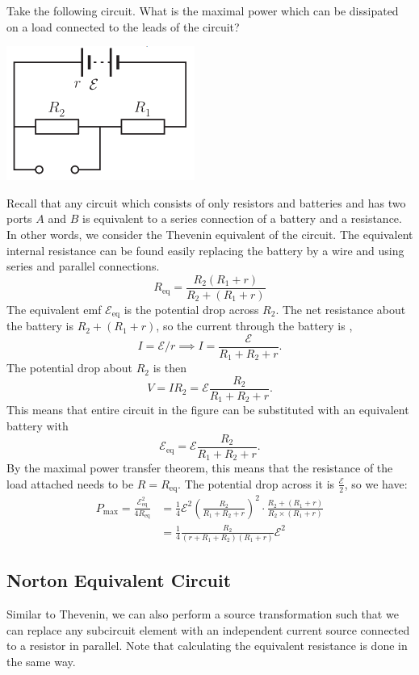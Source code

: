 \documentclass{article}
\begin{document}
\begin{example}
    Take the following circuit. What is the maximal power which can be dissipated on a load connected to the leads of the circuit?
    \begin{center}
        \includegraphics[width=0.3\linewidth]{pr10.png}
    \end{center}
    Recall that any circuit which consists of only resistors and batteries and has two ports $A$ and $B$ is equivalent to a series connection of a battery and a resistance. In other words, we consider the Thevenin equivalent of the circuit. The equivalent internal resistance can be found easily replacing the battery by a wire and using series and parallel connections.
$$R_{\text{eq}} = \frac{R_2(R_1+r)}{R_2 + (R_1+r)}$$The equivalent emf $\mathcal{E}_{\text{eq}}$ is the potential drop across $R_2$. The net resistance about the battery is $R_2 + (R_1+r)$, so the current through the battery is ,
\[ I = \mathcal{E}/r\implies I = \frac{\mathcal{E}}{R_1+R_2+r}.\]The potential drop about $R_2$ is then
\[V = IR_2 = \mathcal{E}\frac{R_2}{R_1+R_2+r}.\]This means that entire circuit in the figure can be substituted with an equivalent battery with
$$\mathcal{E}_{\text{eq}} = \mathcal{E}\frac{R_2}{R_1+R_2+r}.$$By the maximal power transfer theorem, this means that the resistance of the load attached needs to be $R=R_\text{eq}$. The potential drop across it is $\frac{\mathcal{E}}{2}$, so we have: 
\begin{align*}
P_{\text{max}} = \frac{\mathcal{E}_{\text{eq}}^2}{4R_{\text{eq}}} &= \frac{1}{4}\mathcal{E}^2 \left(\frac{R_2}{R_1+R_2+r}\right)^2 \cdot \frac{R_2 + (R_1+r)}{R_2\times (R_1+r)} \\
&= \frac{1}{4}\frac{R_2}{(r + R_1 + R_2)(R_1 + r)}\mathcal{E}^2
\end{align*}
\end{example}
\subsection{Norton Equivalent Circuit}
Similar to Thevenin, we can also perform a source transformation such that we can replace any subcircuit element with an independent current source connected to a resistor in parallel. Note that calculating the equivalent resistance is done in the same way.
\end{document}
